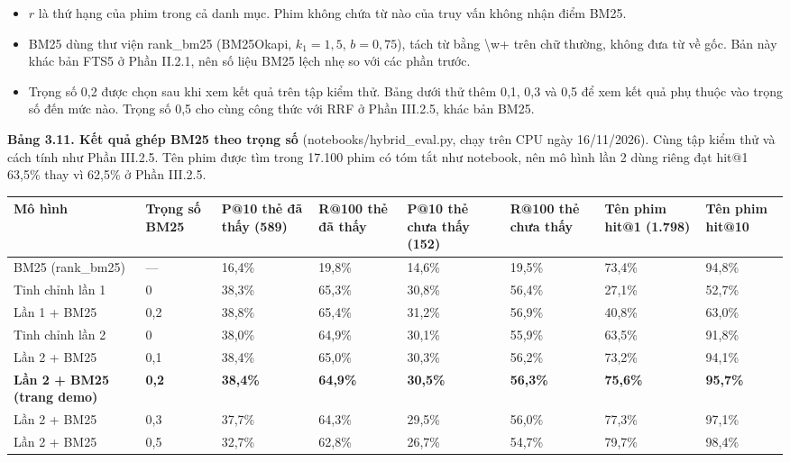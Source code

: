 \documentclass[12pt,a4paper]{article}
\providecommand{\tightlist}{\setlength{\itemsep}{0pt}\setlength{\parskip}{0pt}}
\newcommand{\np}{\Needspace{8\baselineskip}}
\begin{document}
\begin{itemize}
\tightlist
\item $r$ là thứ hạng của phim trong cả danh mục. Phim không chứa từ nào của truy vấn không nhận điểm BM25.
\item BM25 dùng thư viện rank\_bm25 (BM25Okapi, $k_1 = 1{,}5$, $b = 0{,}75$), tách từ bằng \textbackslash w+ trên chữ thường, không đưa từ về gốc. Bản này khác bản FTS5 ở Phần II.2.1, nên số liệu BM25 lệch nhẹ so với các phần trước.
\item Trọng số 0,2 được chọn sau khi xem kết quả trên tập kiểm thử. Bảng dưới thử thêm 0,1, 0,3 và 0,5 để xem kết quả phụ thuộc vào trọng số đến mức nào. Trọng số 0,5 cho cùng công thức với RRF ở Phần III.2.5, khác bản BM25.
\end{itemize}

\np\textbf{Bảng 3.11. Kết quả ghép BM25 theo trọng số} (notebooks/hybrid\_eval.py, chạy trên CPU ngày 16/11/2026). Cùng tập kiểm thử và cách tính như Phần III.2.5. Tên phim được tìm trong 17.100 phim có tóm tắt như notebook, nên mô hình lần 2 dùng riêng đạt hit@1 63,5\% thay vì 62,5\% ở Phần III.2.5.

{\def\LTcaptype{}\footnotesize
\begin{longtable}[]{@{}*{8}{P{(\linewidth - 14\tabcolsep) * }}@{}}
\toprule
\textbf{Mô hình} & \textbf{Trọng số BM25} & \textbf{P@10 thẻ đã thấy (589)} & \textbf{R@100 thẻ đã thấy} & \textbf{P@10 thẻ chưa thấy (152)} & \textbf{R@100 thẻ chưa thấy} & \textbf{Tên phim hit@1 (1.798)} & \textbf{Tên phim hit@10} \\
\midrule
\endhead
\bottomrule
\endlastfoot
BM25 (rank\_\allowbreak bm25) & --- & 16,4\% & 19,8\% & 14,6\% & 19,5\% & 73,4\% & 94,8\% \\
Tinh chỉnh lần 1 & 0 & 38,3\% & 65,3\% & 30,8\% & 56,4\% & 27,1\% & 52,7\% \\
Lần 1 + BM25 & 0,2 & 38,8\% & 65,4\% & 31,2\% & 56,9\% & 40,8\% & 63,0\% \\
Tinh chỉnh lần 2 & 0 & 38,0\% & 64,9\% & 30,1\% & 55,9\% & 63,5\% & 91,8\% \\
Lần 2 + BM25 & 0,1 & 38,4\% & 65,0\% & 30,3\% & 56,2\% & 73,2\% & 94,1\% \\
\textbf{Lần 2 + BM25 (trang demo)} & \textbf{0,2} & \textbf{38,4\%} & \textbf{64,9\%} & \textbf{30,5\%} & \textbf{56,3\%} & \textbf{75,6\%} & \textbf{95,7\%} \\
Lần 2 + BM25 & 0,3 & 37,7\% & 64,3\% & 29,5\% & 56,0\% & 77,3\% & 97,1\% \\
Lần 2 + BM25 & 0,5 & 32,7\% & 62,8\% & 26,7\% & 54,7\% & 79,7\% & 98,4\% \\
\end{longtable}
}
\end{document}
